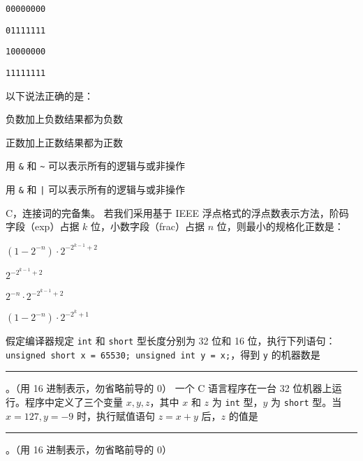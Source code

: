 \begin{problems}
        \begin{figure}[H]
            \centering
        \end{figure}
        \begin{choices}
            \item \texttt{00000000}
            \item \texttt{01111111}
            \item \texttt{10000000}
            \item \texttt{11111111}
        \end{choices}
         以下说法正确的是：
        \begin{choices}
            \item 负数加上负数结果都为负数
            \item 正数加上正数结果都为正数
            \item 用 \verb|&| 和 \verb|~| 可以表示所有的逻辑与或非操作
            \item 用 \verb|&| 和 \verb+|+ 可以表示所有的逻辑与或非操作
        \end{choices}
        \sol C，连接词的完备集。
         若我们采用基于 IEEE 浮点格式的浮点数表示方法，阶码字段（exp）占据 $k$ 位，小数字段（frac）占据 $n$ 位，则最小的规格化正数是：
        \begin{choices}
            \item $(1-2^{-n}) \cdot 2^{-2^{k-1}+2}$
            \item $2^{-2^{k-1}+2}$
            \item $2^{-n} \cdot 2^{-2^{k-1}+2}$
            \item $(1-2^{-n}) \cdot 2^{-2^k+1}$
        \end{choices}
         假定编译器规定 \texttt{int} 和 \texttt{short} 型长度分别为 32 位和 16 位，执行下列语句：\texttt{unsigned short x = 65530; unsigned int y = x;}，得到 \texttt{y} 的机器数是 \rule{2.5cm}{0.25mm}。（用 16 进制表示，勿省略前导的 0）
         一个 C 语言程序在一台 32 位机器上运行。程序中定义了三个变量 $x, y, z$，其中 $x$ 和 $z$ 为 \texttt{int} 型，$y$ 为 \texttt{short} 型。当 $x=127, y=-9$ 时，执行赋值语句 $z=x+y$ 后，$z$ 的值是 \rule{2.5cm}{0.25mm}。（用 16 进制表示，勿省略前导的 0）

\end{problems}

